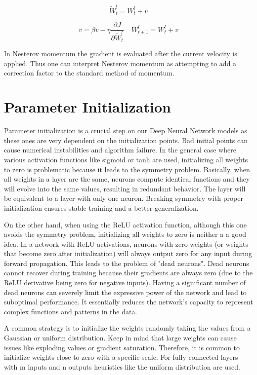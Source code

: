 $$ \tilde{W}_{t}^{l} = W_{t}^{l} + v $$

$$ v = \beta v - \eta \frac{\partial J}{\partial \tilde{W}_{t}^{l}}  ~~~~~  W_{t+1}^{l} = W_{t}^{l} + v $$

\noindent In Nesterov momentum the gradient is evaluated after the current velocity is applied. Thus one can interpret Nesterov momentum as attempting to add a correction factor to the standard method of momentum.

\section{Parameter Initialization}

Parameter initialization is a crucial step on our Deep Neural Network models as these ones are very dependent on the initialization points. Bad initial points can cause numerical instabilities and algorithm failure. In the general case where various activation functions like sigmoid or tanh are used, initializing all weights to zero is problematic because it leads to the symmetry problem. Basically, when all weights in a layer are the same, neurons compute identical functions and they will evolve into the same values, resulting in redundant behavior. The layer will be equivalent to a layer with only one neuron. Breaking symmetry with proper initialization ensures stable training and a better generalization.

\noindent On the other hand, when using the ReLU activation function, although this one avoids the symmetry problem, initializing all weights to zero is neither a a good idea. In a network with ReLU activations, neurons with zero weights (or weights that become zero after initialization) will always output zero for any input during forward propagation. This leads to the problem of "dead neurons". Dead neurons cannot recover during training because their gradients are always zero (due to the ReLU derivative being zero for negative inputs). Having a significant number of dead neurons can severely limit the expressive power of the network and lead to suboptimal performance. It essentially reduces the network's capacity to represent complex functions and patterns in the data.

A common strategy is to initialize the weights randomly taking the values from a Gaussian or uniform distribution. Keep in mind that large weights can cause issues like exploding values or gradient saturation. Therefore, it is common to initialize weights close to zero with a specific scale. For fully connected layers with m inputs and n outputs heuristics like the uniform distribution are used.

